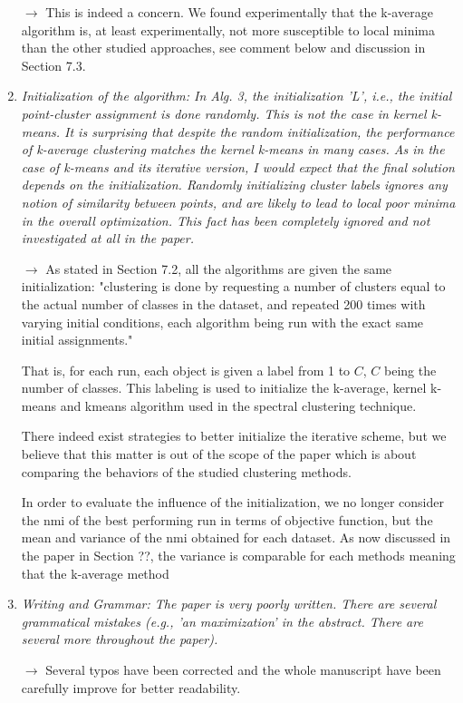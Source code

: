 \documentclass[10pt]{article}
\begin{document}
\begin{enumerate}
$\rightarrow$ This is indeed a concern. We found experimentally that the k-average algorithm is, at least experimentally, not more susceptible to local minima than the other studied approaches, see comment below and discussion in Section 7.3.

\item \emph{Initialization of the algorithm:
In Alg. 3, the initialization 'L', i.e., the initial point-cluster assignment is done randomly. This is not the case in kernel k-means. It is surprising that despite the random initialization, the performance of k-average clustering matches the kernel k-means in many cases. As in the case of k-means and its iterative version, I would expect that the final solution depends on the initialization. Randomly initializing cluster labels ignores any notion of similarity between points, and are likely to lead to local poor minima in the overall optimization. This fact has been completely ignored and not investigated at all in the paper.}

$\rightarrow$ As stated in Section 7.2, all the algorithms are given the same initialization: "clustering is done by requesting a number of clusters equal to the actual number of classes in the dataset, and repeated 200 times with varying initial conditions, each algorithm being run with the exact same initial assignments."

That is, for each run, each object is given a label from 1 to $C$, $C$ being the number of classes. This labeling is used to initialize the k-average, kernel k-means and kmeans algorithm used in the spectral clustering technique.

There indeed exist strategies to better initialize the iterative scheme, but we believe that this matter is out of the scope of the paper which is about comparing the behaviors of the studied clustering methods.

In order to evaluate the influence of the initialization, we no longer consider the nmi of the best performing run in terms of objective function, but the mean and variance of the nmi obtained for each dataset. As now discussed in the paper in Section ??, the variance is comparable for each methods meaning that the k-average method

\item \emph{Writing and Grammar: The paper is very poorly written. There are several grammatical mistakes (e.g., 'an maximization' in the abstract. There are several more throughout the paper).}

$\rightarrow$ Several typos have been corrected and the whole manuscript have been carefully improve for better readability.


\end{enumerate}
\end{document}
